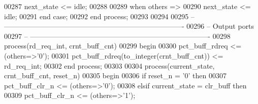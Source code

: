 \begin{DoxyCode}
00287             \textcolor{vhdlchar}{next_state} \textcolor{vhdlchar}{<=} \textcolor{vhdlchar}{idle};
00288             
00289          \textcolor{keywordflow}{when} \textcolor{keywordflow}{others} \textcolor{vhdlchar}{=}\textcolor{vhdlchar}{>} 
00290             \textcolor{vhdlchar}{next_state} \textcolor{vhdlchar}{<=} \textcolor{vhdlchar}{idle};
00291       \textcolor{keywordflow}{end} \textcolor{keywordflow}{case};
00292    \textcolor{keywordflow}{end} \textcolor{keywordflow}{process};
00293    
00294 
00295 \textcolor{keyword}{-- ----------------------------------------------------------------------------}
00296 \textcolor{keyword}{-- Output ports}
00297 \textcolor{keyword}{-- ----------------------------------------------------------------------------}
00298    \textcolor{keywordflow}{process}(rd_req_int, crnt_buff_cnt)
00299 \textcolor{vhdlkeyword}{   begin }
00300       \textcolor{vhdlchar}{pct_buff_rdreq} \textcolor{vhdlchar}{<=} \textcolor{vhdlchar}{(}\textcolor{keywordflow}{others}\textcolor{vhdlchar}{=}\textcolor{vhdlchar}{>}\textcolor{vhdlchar}{'}\textcolor{vhdllogic}{}\textcolor{vhdllogic}{0}\textcolor{vhdlchar}{'}\textcolor{vhdlchar}{)};
00301       \textcolor{vhdlchar}{pct_buff_rdreq}\textcolor{vhdlchar}{(}\textcolor{vhdlchar}{to\_integer}\textcolor{vhdlchar}{(}\textcolor{vhdlchar}{crnt_buff_cnt}\textcolor{vhdlchar}{)}\textcolor{vhdlchar}{)}   \textcolor{vhdlchar}{<=} \textcolor{vhdlchar}{rd_req_int};
00302    \textcolor{keywordflow}{end} \textcolor{keywordflow}{process};
00303    
00304    \textcolor{keywordflow}{process}(current_state, crnt_buff_cnt, reset_n)
00305 \textcolor{vhdlkeyword}{   begin}
00306       \textcolor{keywordflow}{if} \textcolor{vhdlchar}{reset_n} \textcolor{vhdlchar}{=} \textcolor{vhdlchar}{'}\textcolor{vhdllogic}{}\textcolor{vhdllogic}{0}\textcolor{vhdlchar}{'} \textcolor{keywordflow}{then}
00307          \textcolor{vhdlchar}{pct_buff_clr_n} \textcolor{vhdlchar}{<=} \textcolor{vhdlchar}{(}\textcolor{keywordflow}{others}\textcolor{vhdlchar}{=}\textcolor{vhdlchar}{>}\textcolor{vhdlchar}{'}\textcolor{vhdllogic}{}\textcolor{vhdllogic}{0}\textcolor{vhdlchar}{'}\textcolor{vhdlchar}{)};
00308       \textcolor{keywordflow}{elsif} \textcolor{vhdlchar}{current_state} \textcolor{vhdlchar}{=} \textcolor{vhdlchar}{clr\_buff} \textcolor{keywordflow}{then}
00309          \textcolor{vhdlchar}{pct_buff_clr_n} \textcolor{vhdlchar}{<=} \textcolor{vhdlchar}{(}\textcolor{keywordflow}{others}\textcolor{vhdlchar}{=}\textcolor{vhdlchar}{>}\textcolor{vhdlchar}{'}\textcolor{vhdllogic}{}\textcolor{vhdllogic}{1}\textcolor{vhdlchar}{'}\textcolor{vhdlchar}{)};

\end{DoxyCode}
